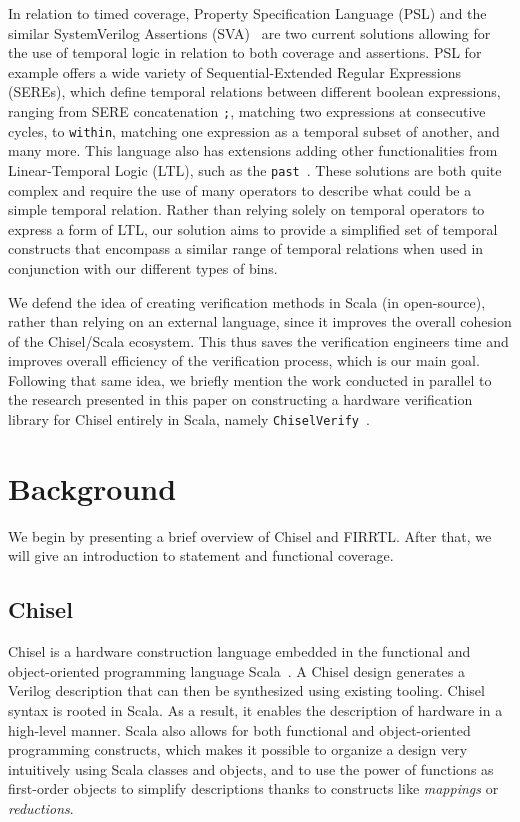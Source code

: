 \documentclass[conference]{IEEEtran}
\newcommand{\martin}[1]{{\color{blue} Martin: #1}}
\begin{document}
In relation to timed coverage, Property Specification Language (PSL) and the similar SystemVerilog Assertions (SVA)~\cite{Boule2008} are two current solutions allowing for the use of temporal logic in relation to both coverage and assertions. 
PSL for example offers a wide variety of Sequential-Extended Regular Expressions (SEREs), which define temporal relations between different boolean expressions, ranging from SERE concatenation \texttt{;}, matching two expressions at consecutive cycles, to \texttt{within}, matching one expression as a temporal subset of another, and many more. This language also has extensions adding other functionalities from Linear-Temporal Logic (LTL), such as the \texttt{past}~\cite{Dax2010:temporal-logics}. These solutions are both quite complex and require the use of many operators to describe what could be a simple temporal relation. Rather than relying solely on temporal operators to express a form of LTL, our solution aims to provide a simplified set of temporal constructs that encompass a similar range of temporal relations when used in conjunction with our different types of bins.

We defend the idea of creating verification methods in Scala (in open-source), rather than relying on an external language, since it improves the overall cohesion of the Chisel/Scala ecosystem. 
This thus saves the verification engineers time and improves overall efficiency of the verification process, which is our main goal. 
Following that same idea, we briefly mention the work conducted in parallel to the research presented in this paper on constructing a hardware verification library for Chisel entirely in Scala, namely \texttt{ChiselVerify}~\cite{ChiselVerify:dobis2021}.

\section{Background}
\label{sec:background}
We begin by presenting a brief overview of Chisel and FIRRTL. 
After that, we will give an introduction to statement and functional coverage.


\subsection{Chisel}
Chisel is a hardware construction language embedded in the functional and object-oriented programming language Scala~\cite{chisel:dac2012, chisel:book, Scala}. 
A Chisel design generates a Verilog description that can then be synthesized using existing tooling. 
Chisel syntax is rooted in Scala. As a result, it enables the description of hardware in a high-level manner. 
Scala also allows for both functional and object-oriented programming constructs, which makes it possible to organize a design very intuitively using Scala classes and objects, and to use the power of functions as first-order objects to simplify descriptions thanks to constructs like \textit{mappings} or \textit{reductions}.
\end{document}
